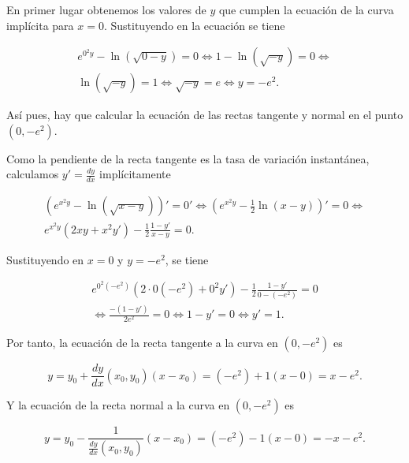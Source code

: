 \documentclass[
  spanish,
  a4paper,
]{scrreport}
\theoremstyle{definition}
\theoremstyle{remark}
\begin{document}
\begin{tcolorbox}[enhanced jigsaw, arc=.35mm, bottomrule=.15mm, bottomtitle=1mm, breakable, colback=white, colbacktitle=quarto-callout-tip-color!10!white, colframe=quarto-callout-tip-color-frame, coltitle=black, left=2mm, leftrule=.75mm, opacityback=0, opacitybacktitle=0.6, rightrule=.15mm, title=\textcolor{quarto-callout-tip-color}{\faLightbulb}\hspace{0.5em}{Solución}, titlerule=0mm, toprule=.15mm, toptitle=1mm]

En primer lugar obtenemos los valores de \(y\) que cumplen la ecuación
de la curva implícita para \(x=0\). Sustituyendo en la ecuación se tiene

\[\begin{gathered} e^{0^2y}-\ln(\sqrt{0-y})= 0 \Leftrightarrow 1-\ln(\sqrt{-y}) = 0 \Leftrightarrow \\
\ln(\sqrt{-y}) = 1 \Leftrightarrow  \sqrt{-y} = e \Leftrightarrow y=-e^2. \end{gathered}\]

Así pues, hay que calcular la ecuación de las rectas tangente y normal
en el punto \((0,-e^2)\).

Como la pendiente de la recta tangente es la tasa de variación
instantánea, calculamos \(y'=\frac{dy}{dx}\) implícitamente

\[\begin{gathered} \left(e^{x^2y}-\ln(\sqrt{x-y})\right)'= 0' \Leftrightarrow \left(e^{x^2y}-\frac{1}{2}\ln(x-y)\right)'= 0 \Leftrightarrow \\
e^{x^2y}(2xy+x^2y')-\frac{1}{2}\frac{1-y'}{x-y} = 0. \end{gathered}\]

Sustituyendo en \(x=0\) y \(y=-e^2\), se tiene

\[\begin{gathered} e^{0^2(-e^2)}(2\cdot0(-e^2)+0^2y')-\frac{1}{2}\frac{1-y'}{0-(-e^2)} = 0 \\
\Leftrightarrow \frac{-(1-y')}{2e^2} =0 \Leftrightarrow 1-y' = 0 \Leftrightarrow y'=1. \end{gathered}\]

Por tanto, la ecuación de la recta tangente a la curva en \((0,-e^2)\)
es

\[y = y_0 + \frac{dy}{dx}(x_0,y_0) (x-x_0) = (-e^2)+1(x-0) = x-e^2.\]

Y la ecuación de la recta normal a la curva en \((0,-e^2)\) es

\[y = y_0 - \frac{1}{\frac{dy}{dx}(x_0,y_0)} (x-x_0) = (-e^2)-1(x-0) = -x-e^2.\]

\end{tcolorbox}
\end{document}
